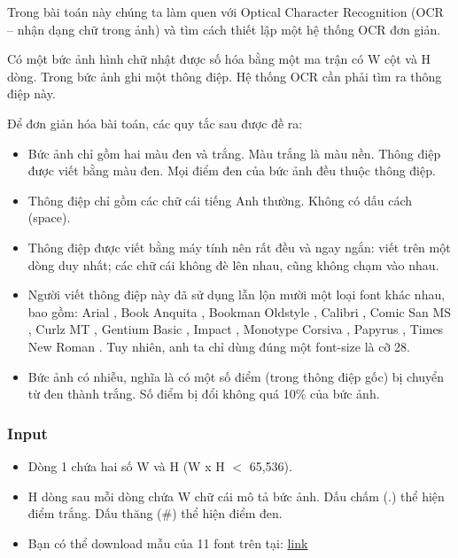 



   Trong bài toán này chúng ta làm quen với Optical Character Recognition (OCR – nhận dạng chữ trong ảnh) và tìm cách thiết lập một hệ thống OCR đơn giản.  

   Có một bức ảnh hình chữ nhật được số hóa bằng một ma trận có W cột và H dòng. Trong bức ảnh ghi một thông điệp. Hệ thống OCR cần phải tìm ra thông điệp này.  

   Để đơn giản hóa bài toán, các quy tắc sau được đề ra:  
\begin{itemize}
	\item 

     Bức ảnh chỉ gồm hai màu đen và trắng. Màu trắng là màu nền. Thông điệp được viết bằng màu đen. Mọi điểm đen của bức ảnh đều thuộc thông điệp.    
	\item 

     Thông điệp chỉ gồm các chữ cái tiếng Anh thường. Không có dấu cách (space).    
	\item 

     Thông điệp được viết bằng máy tính nên rất đều và ngay ngắn: viết trên một dòng duy nhất; các chữ cái không đè lên nhau, cũng không chạm vào nhau.    
	\item 

     Người viết thông điệp này đã sử dụng lẫn lộn mười một loại font khác nhau, bao gồm:            Arial           ,            Book Anquita           ,            Bookman Oldstyle           ,            Calibri           ,            Comic San MS           ,            Curlz MT           ,            Gentium Basic           ,            Impact           ,            Monotype Corsiva           ,            Papyrus           ,            Times New Roman           . Tuy nhiên, anh ta chỉ dùng đúng một font-size là cỡ 28.    
	\item 

     Bức ảnh có nhiễu, nghĩa là có một số điểm (trong thông điệp gốc) bị chuyển từ đen thành trắng. Số điểm bị đổi không quá 10\% của bức ảnh.    
\end{itemize}

\subsubsection{   Input  }
\begin{itemize}
	\item 

     Dòng  1 chứa hai số W và H (W x H $<$ 65,536).    
	\item 

     H dòng sau mỗi dòng chứa W chữ cái mô tả bức ảnh. Dấu  chấm (.) thể hiện điểm trắng. Dấu thăng (\#) thể hiện điểm đen.    
	\item 

     Bạn có thể download mẫu của 11 font trên tại:     \href{../../../content/voj:VMVSOS.zip}{      link     }
\end{itemize}

